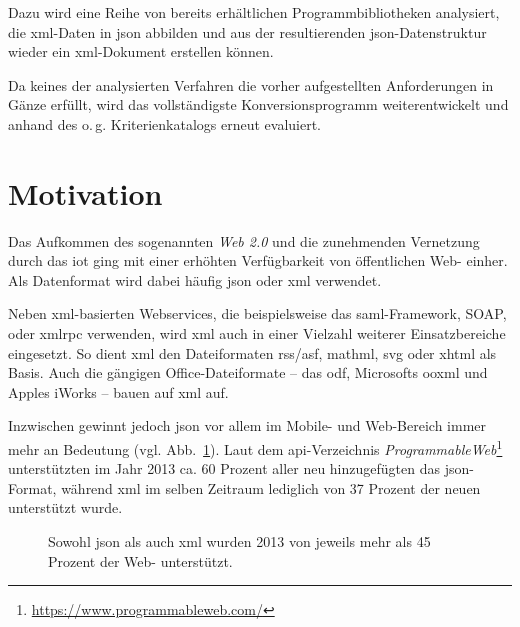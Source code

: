 Dazu wird eine Reihe von bereits erhältlichen Programmbibliotheken analysiert,
die \acrshort{xml}-Daten in \acrshort{json} abbilden und aus der resultierenden
\acrshort{json}-Datenstruktur wieder ein \acrshort{xml}-Dokument erstellen können.

Da keines der analysierten Verfahren die vorher aufgestellten Anforderungen
in Gänze erfüllt, wird das vollständigste Konversionsprogramm
weiterentwickelt und anhand des o.\,g. Kriterienkatalogs erneut evaluiert.

\section{Motivation}
\label{sec:motivation}
Das Aufkommen des sogenannten \emph{Web 2.0} und die zunehmenden Vernetzung
durch das \gls{iot} ging mit einer erhöhten
Verfügbarkeit von öffentlichen Web- einher. Als Datenformat wird dabei
häufig \acrshort{json} oder \acrshort{xml} verwendet.

Neben \acrshort{xml}-basierten Webservices, die beispielsweise das \acrshort{saml}-Framework, SOAP,
oder \gls{xmlrpc} verwenden, wird \acrshort{xml} auch in einer Vielzahl weiterer
Einsatzbereiche eingesetzt. So dient \acrshort{xml} den Dateiformaten \acrshort{rss}/\acrshort{asf}, \acrshort{mathml},
\gls{svg} oder \gls{xhtml} als Basis. Auch die gängigen
Office-Dateiformate -- das \acrfull{odf}, Microsofts %
\acrfull{ooxml} und Apples iWorks -- bauen auf \acrshort{xml} auf. %

Inzwischen gewinnt jedoch \acrshort{json} vor allem im Mobile-
und Web-Bereich immer mehr an Bedeutung (vgl. Abb.~\ref{fig:xmljsonapis}). Laut dem \acrshort{api}-Verzeichnis
\emph{ProgrammableWeb}\footnote{\url{https://www.programmableweb.com/}} unterstützten im Jahr 2013 ca. 60 Prozent aller neu
hinzugefügten  das \acrshort{json}-Format, während
\acrshort{xml} im selben Zeitraum lediglich von 37 Prozent der neuen 
unterstützt wurde.~\cite{duvander2013convergence}

\begin{figure}[h!]
    \begin{center}
        
    \end{center}
    \caption{Sowohl \acrshort{json} als auch \acrshort{xml} wurden 2013 von jeweils mehr als 45 Prozent der Web- unterstützt.}
    \label{fig:xmljsonapis}
\end{figure}


